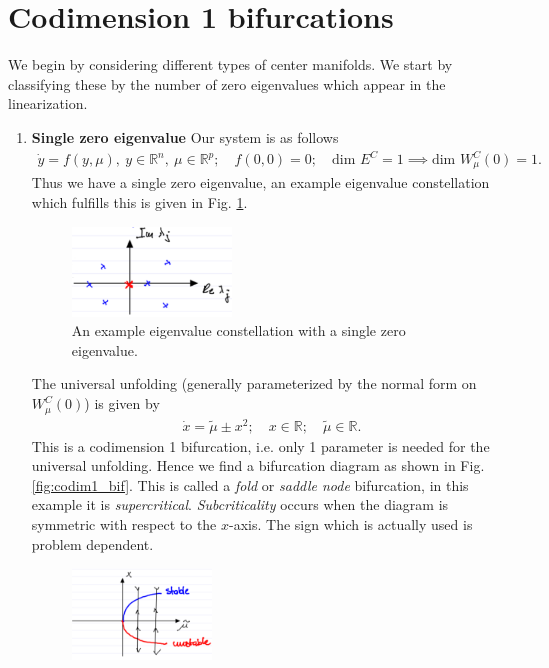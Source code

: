 \section{Codimension 1 bifurcations}
We begin by considering different types of center manifolds. We start by classifying these by the number of zero eigenvalues which appear in the linearization.
\begin{enumerate}
	\item \textbf{Single zero eigenvalue} Our system is as follows
		\begin{align}
			\dot{y} = f(y, \mu),\ y \in \mathbb{R}^{n},\ \mu\in \mathbb{R}^{p};\quad f(0,0)=0;\quad  \textrm{dim }E^{C}=1\implies  \textrm{dim } W^{C}_{\mu }(0)=1.  
		\end{align}
		Thus we have a single zero eigenvalue, an example eigenvalue constellation which fulfills this is given in Fig. \ref{fig:1zero_eigv}.
		\begin{figure}[h!]
			\centering
			\includegraphics[width=0.4\textwidth]{figures/ch3/12onezero_eigv.png}
			\caption{An example eigenvalue constellation with a single zero eigenvalue.}
			\label{fig:1zero_eigv}
		\end{figure}
		The universal unfolding (generally parameterized by the normal form on $W^{C}_{\mu }(0)$) is given by
		\begin{align}
			\boxed{
				\dot{x} = \tilde{\mu }\pm x^2;\quad x \in \mathbb{R};\quad \tilde{\mu } \in\mathbb{R}.
			}
		\end{align}
		This is a codimension 1 bifurcation, i.e. only 1 parameter is needed for the universal unfolding. Hence we find a bifurcation diagram as shown in Fig. \ref{fig:codim1_bif}. This is called a \emph{fold} or \emph{saddle node} bifurcation, in this example it is \emph{supercritical}. \emph{Subcriticality} occurs when the diagram is symmetric with respect to the $x$-axis. The sign which is actually used is problem dependent.
		\begin{figure}[h!]
			\centering
			\includegraphics[width=0.35\textwidth]{figures/ch3/13codim1_bif.png}

\end{figure}
\end{enumerate}
